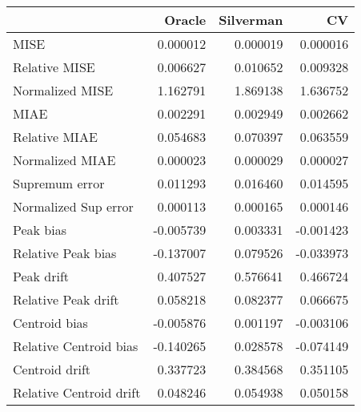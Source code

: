 \begin{tabular}{lrrr}
  \toprule
 & Oracle & Silverman & CV \\ 
  \midrule
MISE & 0.000012 & 0.000019 & 0.000016 \\ 
  Relative MISE & 0.006627 & 0.010652 & 0.009328 \\ 
  Normalized MISE & 1.162791 & 1.869138 & 1.636752 \\ 
  MIAE & 0.002291 & 0.002949 & 0.002662 \\ 
  Relative MIAE & 0.054683 & 0.070397 & 0.063559 \\ 
  Normalized MIAE & 0.000023 & 0.000029 & 0.000027 \\ 
  Supremum error & 0.011293 & 0.016460 & 0.014595 \\ 
  Normalized Sup error & 0.000113 & 0.000165 & 0.000146 \\ 
  Peak bias & -0.005739 & 0.003331 & -0.001423 \\ 
  Relative Peak bias & -0.137007 & 0.079526 & -0.033973 \\ 
  Peak drift & 0.407527 & 0.576641 & 0.466724 \\ 
  Relative Peak drift & 0.058218 & 0.082377 & 0.066675 \\ 
  Centroid bias & -0.005876 & 0.001197 & -0.003106 \\ 
  Relative Centroid bias & -0.140265 & 0.028578 & -0.074149 \\ 
  Centroid drift & 0.337723 & 0.384568 & 0.351105 \\ 
  Relative Centroid drift & 0.048246 & 0.054938 & 0.050158 \\ 
   \bottomrule
\end{tabular}
